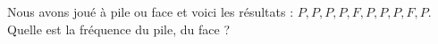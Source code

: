 
\begin{exercice}\label{exoSeconde-0025}

    Nous avons joué à pile ou face et voici les résultats : $ P,P,P,P,F,P,P,P,F,P$. Quelle est la fréquence du pile, du face ?

\end{exercice}
